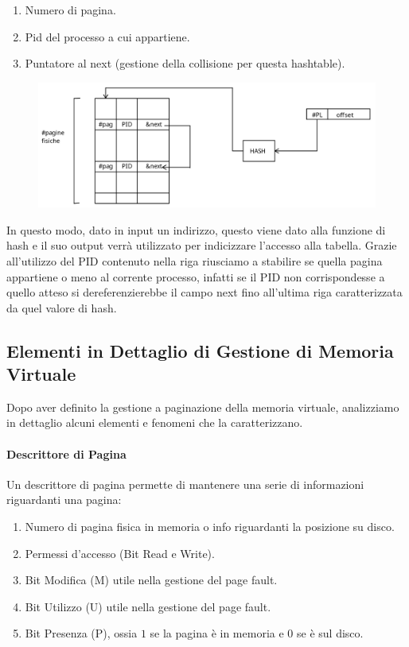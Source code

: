 \documentclass{article}
\begin{document}
\begin{enumerate}
    \item Numero di pagina.
    \item Pid del processo a cui appartiene.
    \item Puntatore al next (gestione della collisione per questa hashtable).
\end{enumerate}

\begin{figure}[htbp]
    \center
    \includegraphics[scale=0.25]{img/coreMap.png}
\end{figure}


In questo modo, dato in input un indirizzo, questo viene dato alla funzione di hash e il suo output verrà utilizzato per indicizzare l'accesso alla tabella.
Grazie all'utilizzo del PID contenuto nella riga riusciamo a stabilire se quella pagina appartiene o meno al corrente processo, infatti se il PID non corrispondesse a quello atteso si dereferenzierebbe il campo next fino all'ultima riga caratterizzata da quel valore di hash.

\subsection{Elementi in Dettaglio di Gestione di Memoria Virtuale}

Dopo aver definito la gestione a paginazione della memoria virtuale, analizziamo in dettaglio alcuni elementi e fenomeni che la caratterizzano.

\paragraph{Descrittore di Pagina} Un descrittore di pagina permette di mantenere una serie di informazioni riguardanti una pagina:

\begin{enumerate}
    \item Numero di pagina fisica in memoria o info riguardanti la posizione su disco.
    \item Permessi d'accesso (Bit Read e Write).
    \item Bit Modifica (M) utile nella gestione del page fault.
    \item Bit Utilizzo (U) utile nella gestione del page fault.
    \item Bit Presenza (P), ossia $1$ se la pagina è in memoria e $0$ se è sul disco. 
\end{enumerate}
\end{document}
